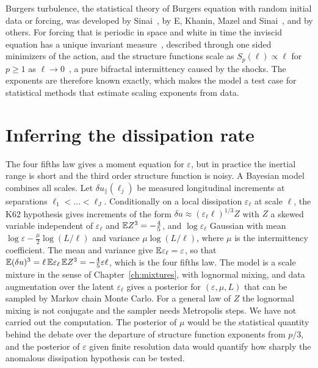 Burgers turbulence, the statistical theory of Burgers equation with random initial data or forcing, was developed by Sinai~\cite{sinai1992}, by E, Khanin, Mazel and Sinai~\cite{ekms2000}, and by others. For forcing that is periodic in space and white in time the inviscid equation has a unique invariant measure~\cite{ekms2000}, described through one sided minimizers of the action, and the structure functions scale as $S_p(\ell)\propto\ell$ for $p\geq1$ as $\ell\to0$~\cite{evandeneijnden2000}, a pure bifractal intermittency caused by the shocks. The exponents are therefore known exactly, which makes the model a test case for statistical methods that estimate scaling exponents from data.

\section{Inferring the dissipation rate}\label{sec:infer_dissipation}

The four fifths law gives a moment equation for $\varepsilon$, but in practice the inertial range is short and the third order structure function is noisy. A Bayesian model combines all scales. Let $\delta u_\parallel(\ell_j)$ be measured longitudinal increments at separations $\ell_1<\dots<\ell_J$. Conditionally on a local dissipation $\varepsilon_\ell$ at scale $\ell$, the K62 hypothesis gives increments of the form $\delta u\approx(\varepsilon_\ell\ell)^{1/3}Z$ with $Z$ a skewed variable independent of $\varepsilon_\ell$ and $\mathbb{E} Z^3 = -\frac45$, and $\log\varepsilon_\ell$ Gaussian with mean $\log\varepsilon-\frac{\mu}{2}\log(L/\ell)$ and variance $\mu\log(L/\ell)$, where $\mu$ is the intermittency coefficient. The mean and variance give $\mathbb{E}\varepsilon_\ell = \varepsilon$, so that $\mathbb{E}(\delta u)^3 = \ell\,\mathbb{E}\varepsilon_\ell\,\mathbb{E} Z^3 = -\frac45\varepsilon\ell$, which is the four fifths law. The model is a scale mixture in the sense of Chapter~\ref{ch:mixtures}, with lognormal mixing, and data augmentation over the latent $\varepsilon_\ell$ gives a posterior for $(\varepsilon,\mu,L)$ that can be sampled by Markov chain Monte Carlo. For a general law of $Z$ the lognormal mixing is not conjugate and the sampler needs Metropolis steps. We have not carried out the computation. The posterior of $\mu$ would be the statistical quantity behind the debate over the departure of structure function exponents from $p/3$, and the posterior of $\varepsilon$ given finite resolution data would quantify how sharply the anomalous dissipation hypothesis can be tested.

